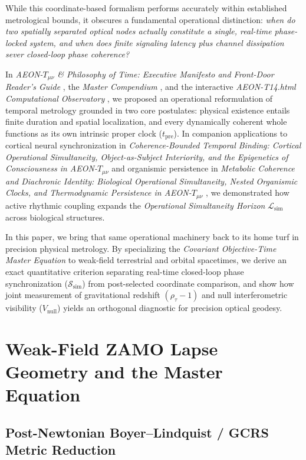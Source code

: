 \documentclass[11pt,a4paper]{article}
\begin{document}
While this coordinate-based formalism performs accurately within established metrological bounds, it obscures a fundamental operational distinction: \emph{when do two spatially separated optical nodes actually constitute a single, real-time phase-locked system, and when does finite signaling latency plus channel dissipation sever closed-loop phase coherence?}

In \emph{AEON-$T_{\mu\nu}$ \& Philosophy of Time: Executive Manifesto and Front-Door Reader's Guide} \cite{damasio2026manifesto}, the \emph{Master Compendium} \cite{damasio2026compendium2}, and the interactive \emph{AEON-T14.html Computational Observatory} \cite{damasio2026observatory}, we proposed an operational reformulation of temporal metrology grounded in two core postulates: physical existence entails finite duration and spatial localization, and every dynamically coherent whole functions as its own intrinsic proper clock ($t_{\mathrm{pre}}$). In companion applications to cortical neural synchronization in \emph{Coherence-Bounded Temporal Binding: Cortical Operational Simultaneity, Object-as-Subject Interiority, and the Epigenetics of Consciousness in AEON-$T_{\mu\nu}$} \cite{damasio2026neuro} and organismic persistence in \emph{Metabolic Coherence and Diachronic Identity: Biological Operational Simultaneity, Nested Organismic Clocks, and Thermodynamic Persistence in AEON-$T_{\mu\nu}$} \cite{damasio2026bio}, we demonstrated how active rhythmic coupling expands the \emph{Operational Simultaneity Horizon} $\mathcal{L}_{\mathrm{sim}}$ across biological structures.

In this paper, we bring that same operational machinery back to its home turf in precision physical metrology. By specializing the \emph{Covariant Objective-Time Master Equation} to weak-field terrestrial and orbital spacetimes, we derive an exact quantitative criterion separating real-time closed-loop phase synchronization ($\mathcal{S}_{\mathrm{sim}}$) from post-selected coordinate comparison, and show how joint measurement of gravitational redshift $(\rho_\tau - 1)$ and null interferometric visibility ($V_{\mathrm{null}}$) yields an orthogonal diagnostic for precision optical geodesy.

\section{Weak-Field ZAMO Lapse Geometry and the Master Equation}

\subsection{Post-Newtonian Boyer--Lindquist / GCRS Metric Reduction}
\end{document}
